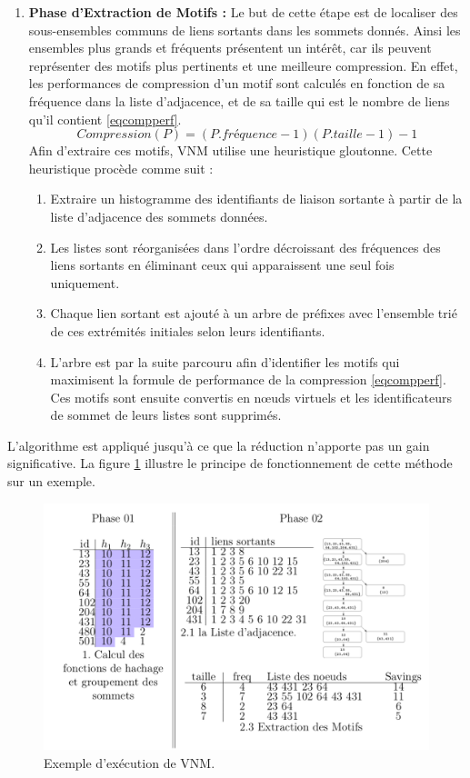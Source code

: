 \begin{enumerate}
					\item \textbf{Phase d'Extraction de Motifs :}				Le but de cette étape est de localiser des sous-ensembles communs de liens sortants dans les sommets donnés. 
				Ainsi les ensembles plus grands et fréquents présentent un intérêt, car ils peuvent représenter des motifs plus pertinents et une meilleure compression. En effet, les performances de compression d'un motif  sont calculés en fonction de sa fréquence dans la liste d'adjacence, et de sa taille qui est le nombre de liens qu'il contient \eqref{eqcompperf}.
				\begin{equation}
				Compression(P)=(P.fréquence-1)(P.taille-1)-1
				\label{eqcompperf}
				\end{equation}
				Afin d'extraire ces motifs, VNM utilise une heuristique gloutonne. Cette heuristique procède comme suit :
				\begin{enumerate}
				\item Extraire un histogramme des identifiants de liaison sortante à partir de la liste d'adjacence des sommets données.
				\item Les listes sont réorganisées dans l'ordre décroissant des fréquences des liens sortants en éliminant ceux qui apparaissent une seul fois uniquement.
				\item Chaque lien sortant est ajouté à un arbre de préfixes avec l'ensemble trié de ces extrémités initiales selon leurs identifiants. 
				\item L'arbre est par la suite parcouru afin d'identifier les motifs qui maximisent la formule de performance de la compression \ref{eqcompperf}. Ces motifs sont ensuite convertis en nœuds virtuels et les identificateurs de sommet de leurs listes sont supprimés.
				\end{enumerate}
				 
				\end{enumerate}
				
				L'algorithme est appliqué jusqu'à ce que la réduction n'apporte pas un gain significative. La figure \ref{VNM_exemple} illustre le principe de fonctionnement de cette méthode sur un exemple.
				
				
		
		
			\begin{figure}[!h]
			\includegraphics[scale=0.3,center]{./ressources/image/VNM_exemple.png}
			\caption[Exemple d'exécution de VNM.]{Exemple d'exécution de VNM.}
			\label{VNM_exemple}
	\end{figure}